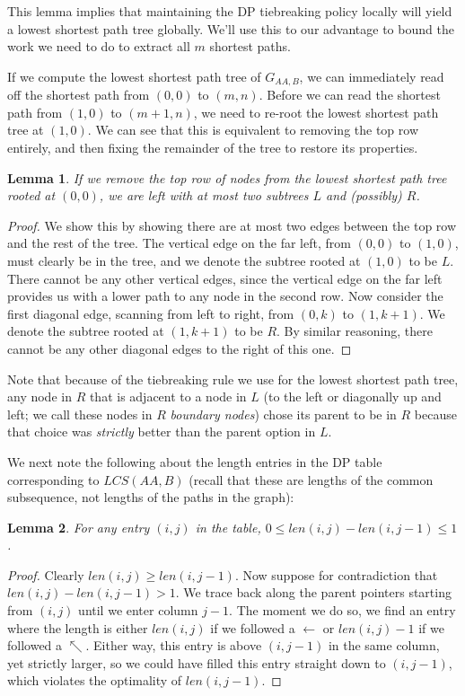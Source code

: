 \documentclass{article}
\newtheorem{lemma}{Lemma}
\begin{document}
This lemma implies that maintaining the DP tiebreaking policy locally will yield a lowest shortest path tree globally.  We'll use this to our advantage to bound the work we need to do to extract all $m$ shortest paths.

If we compute the lowest shortest path tree of $G_{AA,B}$, we can immediately read off the shortest path from $(0,0)$ to $(m, n)$.  Before we can read the shortest path from $(1,0)$ to $(m + 1, n)$, we need to re-root the lowest shortest path tree at $(1,0)$.  We can see that this is equivalent to removing the top row entirely, and then fixing the remainder of the tree to restore its properties.

\begin{lemma}
If we remove the top row of nodes from the lowest shortest path tree rooted at $(0,0)$, we are left with at most two subtrees $L$ and (possibly) $R$.
\end{lemma}
\begin{proof}
We show this by showing there are at most two edges between the top row and the rest of the tree.  The vertical edge on the far left, from $(0,0)$ to $(1,0)$, must clearly be in the tree, and we denote the subtree rooted at $(1,0)$ to be $L$.  There cannot be any other vertical edges, since the vertical edge on the far left provides us with a lower path to any node in the second row.  Now consider the first diagonal edge, scanning from left to right, from $(0,k)$ to $(1,k+1)$.  We denote the subtree rooted at $(1,k+1)$ to be $R$.  By similar reasoning, there cannot be any other diagonal edges to the right of this one.
\end{proof}

Note that because of the tiebreaking rule we use for the lowest shortest path tree, any node in $R$ that is adjacent to a node in $L$ (to the left or diagonally up and left; we call these nodes in $R$ \emph{boundary nodes}) chose its parent to be in $R$ because that choice was \emph{strictly} better than the parent option in $L$.

We next note the following about the length entries in the DP table corresponding to $LCS(AA,B)$ (recall that these are lengths of the common subsequence, not lengths of the paths in the graph):
\begin{lemma}
For any entry $(i,j)$ in the table, $0 \leq len(i,j) - len(i,j-1) \leq 1$.
\end{lemma}
\begin{proof}
Clearly $len(i,j) \geq len(i,j-1)$.  Now suppose for contradiction that $len(i,j) - len(i,j-1) > 1$.  We trace back along the parent pointers starting from $(i,j)$ until we enter column $j-1$.  The moment we do so, we find an entry where the length is either $len(i,j)$ if we followed a $\leftarrow$ or $len(i,j)-1$ if we followed a $\nwarrow$.  Either way, this entry is above $(i,j-1)$ in the same column, yet strictly larger, so we could have filled this entry straight down to $(i,j-1)$, which violates the optimality of $len(i,j-1)$.
\end{proof}
\end{document}
